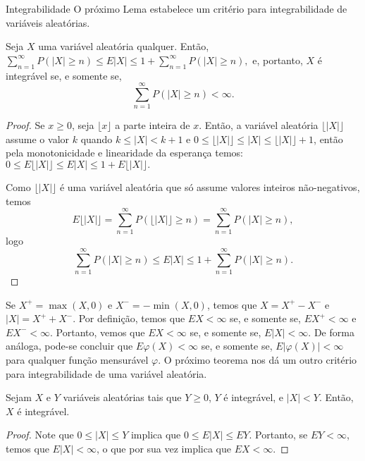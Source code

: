 \begin{frame}{Integrabilidade}
%
%
%
O próximo Lema estabelece um critério para integrabilidade de variáveis aleatórias.
\begin{lema} \label{lem:integ} Seja $X$ uma variável aleatória qualquer.
Então,
$\sum_{n=1}^{\infty}P(|X|\geq n)\leq E|X|\leq 1+\sum_{n=1}^{\infty}P(|X|\geq n),$
e, portanto, $X$ é integrável se, e somente se,
$$\sum_{n=1}^{\infty}P(|X|\geq n)<\infty.$$ 
\end{lema}
%
%
%
%
\begin{proof} Se $x\geq 0$, seja $\lfloor x\rfloor$ a parte inteira de $x$. Então,
a variável aleatória $\lfloor |X|\rfloor$ assume o valor $k$ quando
$k\leq |X|<k+1$ e $0\leq \lfloor |X|\rfloor\leq |X|\leq \lfloor
|X|\rfloor +1$, então pela monotonicidade e linearidade da esperança
temos:
$0\leq E\lfloor |X|\rfloor\leq E|X|\leq 1+E\lfloor
|X|\rfloor.$

Como $\lfloor |X|\rfloor$ é uma variável aleatória que só assume
valores inteiros não-negativos, temos
$$E\lfloor |X|\rfloor=\sum_{n=1}^{\infty}P(\lfloor |X|\rfloor\geq n)=\sum_{n=1}^{\infty}P(|X|\geq n),$$
logo
$$\sum_{n=1}^{\infty}P(|X|\geq n)\leq E|X|\leq 1+\sum_{n=1}^{\infty}P(|X|\geq n).$$
\end{proof}
\end{frame}
%
\begin{frame}
%
%
Se $X^+=\max(X,0)$ e $X^-=-\min(X,0)$, temos que $X=X^+-X^-$ e $|X|=X^++X^-$. Por definição, temos que $EX<\infty$ se, e somente  se, $EX^+<\infty$ e $EX^-<\infty$. Portanto, vemos que $EX<\infty$ se, e somente se, $E|X|<\infty$. De forma análoga, pode-se concluir que $E\varphi(X)<\infty$ se, e somente se, $E|\varphi(X)|<\infty$ para qualquer função mensurável $\varphi$. O próximo teorema nos dá um outro critério para integrabilidade de uma variável aleatória.
%
\begin{teo}
Sejam $X$ e $Y$ variáveis aleatórias tais que $Y\geq 0$, $Y$ é integrável, e $|X|<Y$. Então, $X$ é integrável.
\end{teo}
%
\begin{proof}
Note que $0\leq |X|\leq Y$ implica que $0\leq E|X|\leq EY$. Portanto, se $EY<\infty$, temos que $E|X|<\infty$, o que por sua vez implica que $EX<\infty$.
\end{proof}
%
\end{frame}
%
